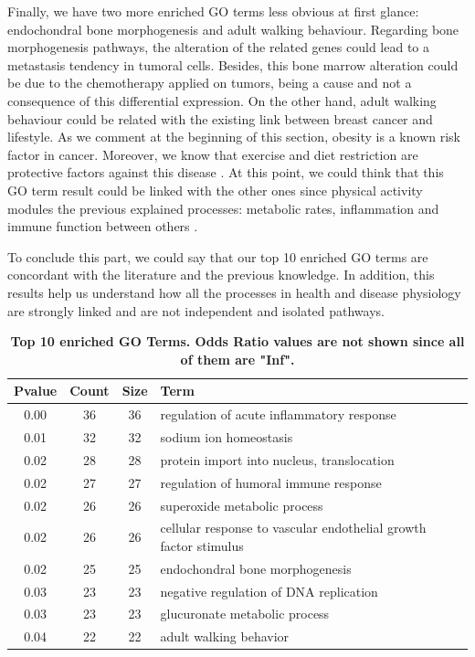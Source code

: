 \documentclass[9pt,twocolumn,twoside]{gsajnl}
\begin{document}
Finally, we have two more enriched GO terms less obvious at first glance: endochondral bone morphogenesis and adult walking behaviour. Regarding bone morphogenesis pathways, the alteration of the related genes could lead to a metastasis tendency in tumoral cells. Besides, this bone marrow alteration could be due to the chemotherapy applied on tumors, being a cause and not a consequence of this differential expression. On the other hand, adult walking behaviour could be related with the existing link between breast cancer and lifestyle. As we comment at the beginning of this section, obesity is a known risk factor in cancer. Moreover, we know that exercise and diet restriction are protective factors against this disease  \citep{Chlebowski}. At this point, we could think that this GO term result could be linked with the other ones since physical activity modules the previous explained processes: metabolic rates, inflammation and immune function between others \citep{McTiernan2008}.
\vspace{2mm}

To conclude this part, we could say that our top 10 enriched GO terms are concordant with the literature and the previous knowledge. In addition, this results help us understand how all the processes in health and disease physiology are strongly linked and are not independent and isolated pathways.


\begin{table}[ht]
\centering
\caption{\bf Top 10 enriched GO Terms. Odds Ratio values are not shown since all of them are "Inf".}
\begin{tableminipage}{\textwidth}
\begin{tabular}{cccp{3cm}}
  \hline
 Pvalue & Count & Size & Term\\ 
  \hline
0.00 &  36 &  36 & regulation of acute inflammatory response\\ 
0.01 &  32 &  32 & sodium ion homeostasis \\ 
0.02 &  28 &  28 & protein import into nucleus, translocation\\ 
0.02 &  27 &  27 & regulation of humoral immune response\\ 
0.02 &  26 &  26 & superoxide metabolic process \\ 
0.02&  26 &  26 & cellular response to vascular endothelial growth factor stimulus\\ 
0.02 &  25 &  25 & endochondral bone morphogenesis\\ 
0.03 &  23 &  23 & negative regulation of DNA replication\\ 
0.03 &  23 &  23 & glucuronate metabolic process\\ 
0.04 &  22 &  22 & adult walking behavior\\ 
   \hline
\end{tabular}
\end{tableminipage}
\label{table}
\end{table}
\end{document}
